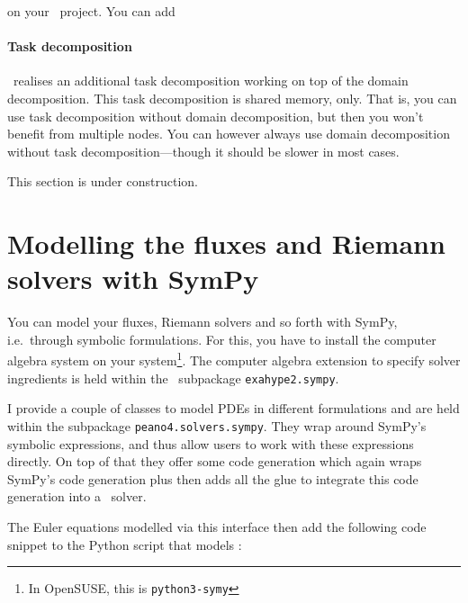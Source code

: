 \noindent
on your \ExaHyPE\ project. You can add  


\paragraph{Task decomposition}
\ExaHyPE\ realises an additional task decomposition working on top of the domain
decomposition. 
This task decomposition is shared memory, only.
That is, you can use task decomposition without domain decomposition, but then
you won't benefit from multiple nodes.
You can however always use domain decomposition without task
decomposition---though it should be slower in most cases.

\begin{remark}
This section is under construction.
\end{remark} 



\section{Modelling the fluxes and Riemann solvers with SymPy}

You can model your fluxes, Riemann solvers and so forth with SymPy, 
i.e.~through symbolic formulations.
For this, you have to install the computer algebra system on your
system\footnote{In OpenSUSE, this is \texttt{python3-symy}}.
The computer algebra extension to specify solver ingredients is held within the
\ExaHyPE\ subpackage \texttt{exahype2.sympy}.


I provide a couple of classes to model PDEs in different formulations and are
held within the subpackage \texttt{peano4.solvers.sympy}.
They wrap around SymPy's symbolic expressions, and thus allow users to work with
these expressions directly.
On top of that they offer some code generation which again wraps SymPy's code
generation plus then adds all the glue to integrate this code generation into a
\Peano\ solver.


The Euler equations modelled via this interface then add the following code
snippet to the Python script that models \Peano:

